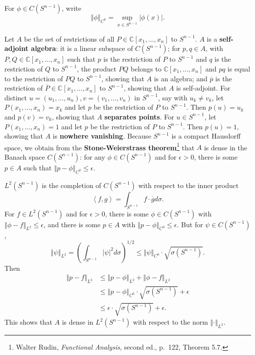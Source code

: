 \documentclass{article}
\newcommand{\inner}[2]{\left\langle #1, #2 \right\rangle}
\newcommand{\norm}[1]{\left\Vert #1 \right\Vert}
\theoremstyle{definition}
\theoremstyle{definition}
\begin{document}
For $\phi \in C(S^{n-1})$, write
\[
\norm{\phi}_{C^0} = \sup_{x \in S^{n-1}} |\phi(x)|.
\]

Let $A$ be the set of restrictions of all $P \in \mathbb{C}[x_1,\ldots,x_n]$ to
$S^{n-1}$. $A$ is a \textbf{self-adjoint algebra}: it is a linear subspace of 
$C(S^{n-1})$; for $p,q \in A$, with $P,Q \in \mathbb{C}[x_1,\ldots,x_n]$ such that
$p$ is the restriction of $P$ to $S^{n-1}$ and $q$ is the restriction of $Q$ to $S^{n-1}$,
the product $PQ$ belongs to $\mathbb{C}[x_1,\ldots,x_n]$ and $pq$ is equal
to the restriction of $PQ$ to $S^{n-1}$, showing that $A$ is an algebra; and $\overline{p}$
is the restriction of $\overline{P} \in \mathbb{C}[x_1,\ldots,x_n]$ to $S^{n-1}$, showing
that $A$ is self-adjoint. 
For distinct $u=(u_1,\ldots,u_n), v = (v_1,\ldots,v_n)$ in $S^{n-1}$, say with $u_k \neq v_k$,
let $P(x_1,\ldots,x_n)=x_k$ and let $p$ be the restriction of $P$ to $S^{n-1}$. 
Then $p(u) = u_k$ and $p(v)=v_k$, showing that $A$ \textbf{separates points}.
For $u \in S^{n-1}$, let $P(x_1,\ldots,x_n) = 1$ and let
$p$ be the restriction of $P$ to $S^{n-1}$. Then $p(u) = 1$, showing that
$A$ is \textbf{nowhere vanishing}. Because
$S^{n-1}$ is a compact Hausdorff space,
we obtain from the
\textbf{Stone-Weierstrass theorem}\footnote{Walter Rudin, {\em Functional
Analysis}, second ed., p.~122, Theorem 5.7.} that $A$ is dense in the Banach
space $C(S^{n-1})$: for any $\phi \in C(S^{n-1})$ and for $\epsilon>0$, there is some
$p \in A$ such that $\norm{p-\phi}_{C^0} \leq \epsilon$. 

$L^2(S^{n-1})$ is the completion of $C(S^{n-1})$ with respect to the inner product
\[
\inner{f}{g} = \int_{S^{n-1}} f \cdot \overline{g} d\sigma.
\]
For $f \in L^2(S^{n-1})$ and for $\epsilon>0$, there is some $\phi \in C(S^{n-1})$ with
$\norm{\phi-f}_{L^2}\leq \epsilon$, and there is some $p \in A$ with
$\norm{p-\phi}_{C^0}\leq \epsilon$.
But for $\psi \in C(S^{n-1})$,
\[
\norm{\psi}_{L^2} = \left( \int_{S^{n-1}} |\psi|^2 d\sigma \right)^{1/2}
\leq \norm{\psi}_{C^0} \cdot \sqrt{\sigma(S^{n-1})}.
\]
Then
\begin{align*}
\norm{p-f}_{L^2} &\leq \norm{p-\phi}_{L^2} + \norm{\phi-f}_{L^2}\\
&\leq \norm{p-\phi}_{C^0} \cdot \sqrt{\sigma(S^{n-1})} + 
\epsilon\\
&\leq \epsilon \cdot \sqrt{\sigma(S^{n-1})}+\epsilon.
\end{align*}
This shows that $A$ is dense in $L^2(S^{n-1})$ with respect to the norm $\norm{\cdot}_{L^2}$. 
\end{document}
